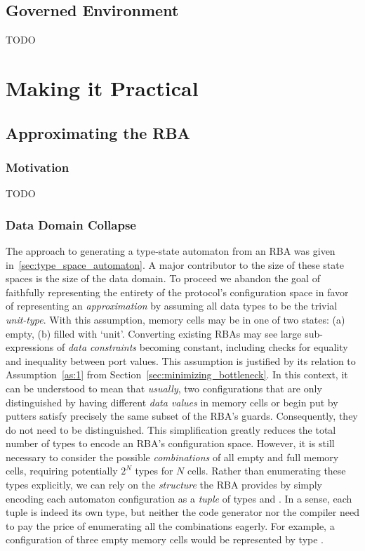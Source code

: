 \subsection{Governed Environment}
TODO

\section{Making it Practical}

\subsection{Approximating the RBA}
\subsubsection{Motivation}
TODO

\subsubsection{Data Domain Collapse}
\label{sec:approximating_rba}
The approach to generating a type-state automaton from an RBA was given in~\ref{sec:type_space_automaton}. A major contributor to the size of these state spaces is the size of the data domain. To proceed we abandon the goal of faithfully representing the entirety of the protocol's configuration space in favor of representing an \textit{approximation} by assuming all data types to be the trivial \textit{unit-type}. With this assumption, memory cells may be in one of two states: (a) empty, (b) filled with `unit'. Converting existing RBAs may see large sub-expressions of \textit{data constraints} becoming constant, including checks for equality and inequality between port values. This assumption is justified by its relation to Assumption~\ref{as:1} from Section~\ref{sec:minimizing_bottleneck}. In this context, it can be understood to mean that \textit{usually}, two configurations that are only distinguished by having different \textit{data values} in memory cells or begin put by putters satisfy precisely the same subset of the RBA's guards. Consequently, they do not need to be distinguished. This simplification greatly reduces the total number of types to encode an RBA's configuration space. However, it is still necessary to consider the possible \textit{combinations} of all empty and full memory cells, requiring potentially $2^N$ types for $N$ cells. Rather than enumerating these types explicitly, we can rely on the \textit{structure} the RBA provides by simply encoding each automaton configuration as a \textit{tuple} of types  and . In a sense, each tuple is indeed its own type, but neither the code generator nor the compiler need to pay the price of enumerating all the combinations eagerly. For example, a configuration of three empty memory cells would be represented by type .


